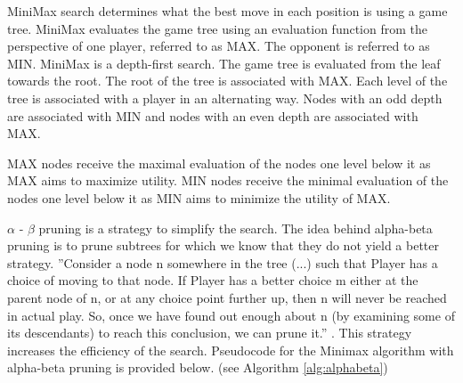 \documentclass{ba-kecs}
\begin{document}
MiniMax search determines what the best move in each position is using a game tree. MiniMax evaluates the game tree using an evaluation function from the perspective of one player, referred to as MAX. The opponent is referred to as MIN. \cite{russell1995modern} MiniMax is a depth-first search. The game tree is evaluated from the leaf towards the root. The root of the tree is associated with MAX. Each level of the tree is associated with a player in an alternating way. Nodes with an odd depth are associated with MIN and nodes with an even depth are associated with MAX. 

MAX nodes receive the maximal evaluation of the nodes one level below it as MAX aims to maximize utility. MIN nodes receive the minimal evaluation of the nodes one level below it as MIN aims to minimize the utility of MAX. \cite{russell1995modern}


$\alpha$ - $\beta$ pruning is a strategy to simplify the search. The idea behind alpha-beta pruning is to prune subtrees for which we know that they do not yield a better strategy. ''Consider a node n somewhere in the tree (...)  such that Player has a choice of moving to that node. If Player has a better choice m either at the parent node of n, or at any choice point further up, then n will never be reached in actual play. So, once we have found out enough about n (by examining some of its descendants) to reach this conclusion, we can prune it.'' \cite{russell1995modern}. This strategy increases the efficiency of the search. Pseudocode for the Minimax algorithm with alpha-beta pruning is provided below. (see Algorithm \ref{alg:alphabeta})
\end{document}
